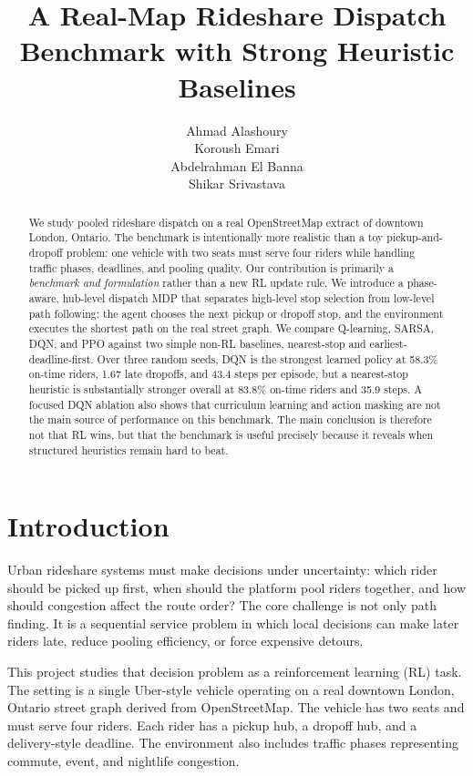 \documentclass{article}
\title{A Real-Map Rideshare Dispatch Benchmark with Strong Heuristic Baselines}
\author{%
  Ahmad Alashoury \\
  \And
  Koroush Emari \\
  \And
  Abdelrahman El Banna \\
  \And
  Shikar Srivastava
}
\begin{document}
\maketitle

\begin{abstract}
We study pooled rideshare dispatch on a real OpenStreetMap extract of downtown London, Ontario. The benchmark is intentionally more realistic than a toy pickup-and-dropoff problem: one vehicle with two seats must serve four riders while handling traffic phases, deadlines, and pooling quality. Our contribution is primarily a \emph{benchmark and formulation} rather than a new RL update rule. We introduce a phase-aware, hub-level dispatch MDP that separates high-level stop selection from low-level path following: the agent chooses the next pickup or dropoff stop, and the environment executes the shortest path on the real street graph. We compare Q-learning, SARSA, DQN, and PPO against two simple non-RL baselines, nearest-stop and earliest-deadline-first. Over three random seeds, DQN is the strongest learned policy at 58.3\% on-time riders, 1.67 late dropoffs, and 43.4 steps per episode, but a nearest-stop heuristic is substantially stronger overall at 83.8\% on-time riders and 35.9 steps. A focused DQN ablation also shows that curriculum learning and action masking are not the main source of performance on this benchmark. The main conclusion is therefore not that RL wins, but that the benchmark is useful precisely because it reveals when structured heuristics remain hard to beat.
\end{abstract}

\section{Introduction}
Urban rideshare systems must make decisions under uncertainty: which rider should be picked up first, when should the platform pool riders together, and how should congestion affect the route order? The core challenge is not only path finding. It is a sequential service problem in which local decisions can make later riders late, reduce pooling efficiency, or force expensive detours.

This project studies that decision problem as a reinforcement learning (RL) task. The setting is a single Uber-style vehicle operating on a real downtown London, Ontario street graph derived from OpenStreetMap. The vehicle has two seats and must serve four riders. Each rider has a pickup hub, a dropoff hub, and a delivery-style deadline. The environment also includes traffic phases representing commute, event, and nightlife congestion.
\end{document}
